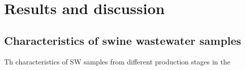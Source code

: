 \section{Results and discussion}
\subsection{Characteristics of swine wastewater samples}
Th characteristics of SW samples from different production stages in the 